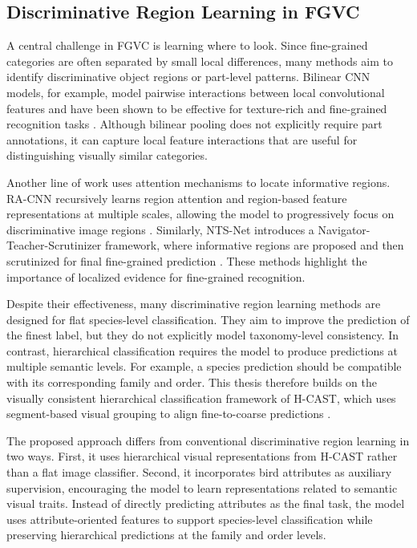 \subsection{Discriminative Region Learning in FGVC}

A central challenge in FGVC is learning where to look. Since fine-grained categories are often separated by small local differences, many methods aim to identify discriminative object regions or part-level patterns. Bilinear CNN models, for example, model pairwise interactions between local convolutional features and have been shown to be effective for texture-rich and fine-grained recognition tasks \cite{lin2015bilinear}. Although bilinear pooling does not explicitly require part annotations, it can capture local feature interactions that are useful for distinguishing visually similar categories.

Another line of work uses attention mechanisms to locate informative regions. RA-CNN recursively learns region attention and region-based feature representations at multiple scales, allowing the model to progressively focus on discriminative image regions \cite{fu2017racnn}. Similarly, NTS-Net introduces a Navigator-Teacher-Scrutinizer framework, where informative regions are proposed and then scrutinized for final fine-grained prediction \cite{yang2018learning}. These methods highlight the importance of localized evidence for fine-grained recognition.

Despite their effectiveness, many discriminative region learning methods are designed for flat species-level classification. They aim to improve the prediction of the finest label, but they do not explicitly model taxonomy-level consistency. In contrast, hierarchical classification requires the model to produce predictions at multiple semantic levels. For example, a species prediction should be compatible with its corresponding family and order. This thesis therefore builds on the visually consistent hierarchical classification framework of H-CAST, which uses segment-based visual grouping to align fine-to-coarse predictions \cite{park2025visually}.

The proposed approach differs from conventional discriminative region learning in two ways. First, it uses hierarchical visual representations from H-CAST rather than a flat image classifier. Second, it incorporates bird attributes as auxiliary supervision, encouraging the model to learn representations related to semantic visual traits. Instead of directly predicting attributes as the final task, the model uses attribute-oriented features to support species-level classification while preserving hierarchical predictions at the family and order levels.


